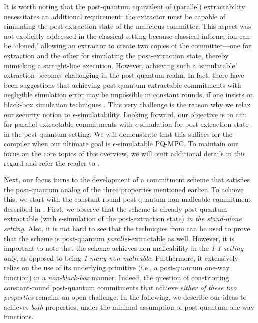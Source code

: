 It is worth noting that the post-quantum equivalent of (parallel) extractability necessitates an additional requirement: the extractor must be capable of simulating the post-extraction state of the malicious committer. This aspect was not explicitly addressed in the classical setting because classical information can be `cloned,' allowing an extractor to create two copies of the committer---one for extraction and the other for simulating the post-extraction state, thereby mimicking a straight-line execution. However, achieving such a `simulatable' extraction becomes challenging in the post-quantum realm. In fact, there have been suggestions that achieving post-quantum extractable commitments with negligible simulation error may be impossible in constant rounds, if one insists on black-box simulation techniques \cite{chia2022impossibility,C:CCLY22,arXiv:CCLL}. This very challenge is the reason why we relax our security notion to $\epsilon$-simulatability. Looking forward, our objective is to aim for parallel-extractable commitments with $\epsilon$-simulation for post-extraction state in the post-quantum setting. We will demonstrate that this suffices for the \cite{FOCS:Wee10,STOC:Goyal11} compiler when our ultimate goal is $\epsilon$-simulatable PQ-MPC. To maintain our focus on the core topics of this overview, we will omit additional details in this regard and refer the reader to .

 Next, our focus turns to the development of a commitment scheme that satisfies the post-quantum analog of the three properties mentioned earlier. To achieve this, we start with the constant-round post-quantum non-malleable commitment described in \cite{FOCS:LPY23}. First, we observe that the \cite{FOCS:LPY23} scheme is already post-quantum extractable (with $\epsilon$-simulation of the post-extraction state) {\em in the stand-alone setting}. Also, it is not hard to see that the techniques from \cite{C:CCLY22} can be used to prove that the \cite{FOCS:LPY23} scheme is post-quantum {\em parallel}-extractable as well. However, it is important to note that the \cite{FOCS:LPY23} scheme achieves non-malleability in the {\em 1-1 setting} only, as opposed to being {\em 1-many non-malleable}. Furthermore, it extensively relies on the use of its underlying primitive (i.e., a post-quantum one-way function) in a {\em non-black-box} manner. Indeed, the question of constructing constant-round post-quantum commitments that achieve {\em either of these two properties} remains an open challenge. In the following, we describe our ideas to achieves {\em both} properties, under the minimal assumption of post-quantum one-way functions.


